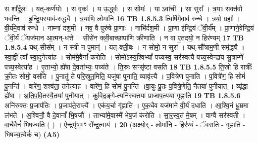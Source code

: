 \documentclass[17pt]{extarticle}
\begin{document}
                  स शा᳚र्दू॒लः । यत्-कर्ण॑योः । स वृकः॑ । य ऊ॒र्द्ध्वः । स सोमः॑ । या ऽवा॑ची । सा सुरा᳚ । त्र॒याः सक्त॑वो भवन्ति । इ॒न्द्रि॒यस्याव॑-रुद्ध्यै । त्र॒याणि॒ लोमा॑नि \textbf{ 16} \newline
                  \newline
                                \textbf{ TB 1.8.5.3} \newline
                  त्विषि॑मे॒वाव॑ रुन्धे । त्रयो॒ ग्रहाः᳚ । वी॒र्य॑मे॒वाव॑ रुन्धे । नाम्ना॑ दश॒मी । नव॒ वै पुरु॑षे प्रा॒णाः । नाभि॑र्दश॒मी । प्रा॒णा इ॑न्द्रि॒यं ॅवी॒र्य᳚म् । प्रा॒णाने॒वेन्द्रि॒यं ॅवी॒र्यं॑ ॅयज॑मान आ॒त्मन्-ध॑त्ते । सीसे॑न क्ली॒बाच्छष्पा॑णि क्रीणाति । न वा ए॒तदयो॒ न हिर॑ण्यम् \textbf{ 17} \newline
                  \newline
                                \textbf{ TB 1.8.5.4} \newline
                  यथ्-सीस᳚म् । न स्त्री न पुमान्॑ । यत्-क्ली॒बः । न सोमो॒ न सुरा᳚ । यथ्-सौ᳚त्राम॒णी समृ॑द्ध्यै । स्वा॒द्वीं त्वा᳚ स्वा॒दुनेत्या॑ह । सोम॑मे॒वैनां᳚ करोति । सोमो᳚ऽस्य॒श्विभ्यां᳚ पच्यस्व॒ सर॑स्वत्यै पच्य॒स्वेन्द्रा॑य सु॒त्राम्णे॑ पच्य॒स्वेत्या॑ह । ए॒ताभ्यो॒ ह्ये॑षा दे॒वता᳚भ्यः॒ पच्य॑ते । ति॒स्रः सꣳसृ॑ष्टा वसति \textbf{ 18} \newline
                  \newline
                                \textbf{ TB 1.8.5.5} \newline
                  ति॒स्रो हि रात्रीः᳚ क्री॒तः सोमो॒ वस॑ति । पु॒नातु॑ ते परि॒स्रुत॒मिति॒ यजु॑षा पुनाति॒ व्यावृ॑त्त्यै । प॒वित्रे॑ण पुनाति । प॒वित्रे॑ण॒ हि सोमं॑ पु॒नन्ति॑ । वारे॑ण॒ शश्व॑ता॒ तनेत्या॑ह । वारे॑ण॒ हि सोमं॑ पु॒नन्ति॑ ।वा॒युः पू॒तः प॒वित्रे॒णेति॒ नैतया॑ पुनीयात् । व्यृ॑द्धा॒ ह्ये॑षा ।  अ॒ति॒प॒वि॒तस्यै॒तया॑ पुनीयात् । कु॒विद॒ङ्गे-त्यनि॑रुक्तया प्राजाप॒त्यया॑ गृह्णाति \textbf{ 19} \newline
                  \newline
                                \textbf{ TB 1.8.5.6} \newline
                  अनि॑रुक्तः प्र॒जाप॑तिः । प्र॒जाप॑ते॒राप्त्यै᳚ । एक॑य॒र्चा गृ॑ह्णाति । ए॒क॒धैव यज॑माने वी॒र्यं॑ दधाति । आ॒श्वि॒नं धू॒म्रमा ल॑भते । अ॒श्विनौ॒ वै दे॒वानां᳚ भि॒षजौ᳚ । ताभ्या॑मे॒वास्मै॑ भेष॒जं क॑रोति । सा॒र॒स्व॒तं मे॒षम् । वाग्वै सर॑स्वती । वा॒चैवैनं॑ भिषज्यति ( ) । ऐ॒न्द्रमृ॑ष॒भꣳ से᳚न्द्र॒त्वाय॑ । \textbf{ 20} \newline
                  \newline
                                    (अक्ष्यो॒र् - लोमा॑नि॒ - हिर॑ण्यं - ॅवसति - गृह्णाति - भिषज्य॒त्येकं॑ च) \textbf{(A5)} \newline \newline
\end{document}
